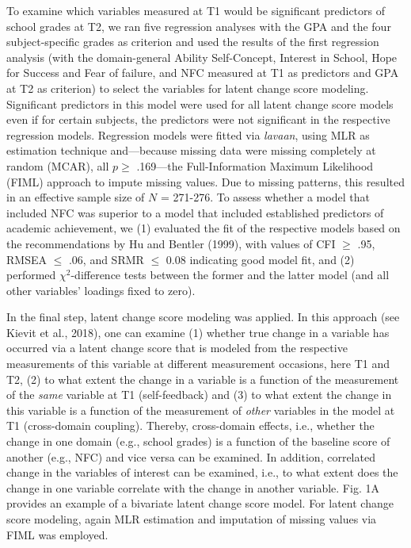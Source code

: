 \documentclass[
  man]{apa6}
\begin{document}
To examine which variables measured at T1 would be significant predictors of school grades at T2, we ran five regression analyses with the GPA and the four subject-specific grades as criterion and used the results of the first regression analysis (with the domain-general Ability Self-Concept, Interest in School, Hope for Success and Fear of failure, and NFC measured at T1 as predictors and GPA at T2 as criterion) to select the variables for latent change score modeling. Significant predictors in this model were used for all latent change score models even if for certain subjects, the predictors were not significant in the respective regression models. Regression models were fitted via \emph{lavaan}, using MLR as estimation technique and---because missing data were missing completely at random (MCAR), all \(p\ge\) .169---the Full-Information Maximum Likelihood (FIML) approach to impute missing values. Due to missing patterns, this resulted in an effective sample size of \(N\) = 271-276. To assess whether a model that included NFC was superior to a model that included established predictors of academic achievement, we (1) evaluated the fit of the respective models based on the recommendations by Hu and Bentler (1999), with values of CFI \(\ge\) .95, RMSEA \(\le\) .06, and SRMR \(\le\) 0.08 indicating good model fit, and (2) performed \(\chi^2\)-difference tests between the former and the latter model (and all other variables' loadings fixed to zero).

In the final step, latent change score modeling was applied. In this approach (see Kievit et al., 2018), one can examine (1) whether true change in a variable has occurred via a latent change score that is modeled from the respective measurements of this variable at different measurement occasions, here T1 and T2, (2) to what extent the change in a variable is a function of the measurement of the \emph{same} variable at T1 (self-feedback) and (3) to what extent the change in this variable is a function of the measurement of \emph{other} variables in the model at T1 (cross-domain coupling). Thereby, cross-domain effects, i.e., whether the change in one domain (e.g., school grades) is a function of the baseline score of another (e.g., NFC) and vice versa can be examined. In addition, correlated change in the variables of interest can be examined, i.e., to what extent does the change in one variable correlate with the change in another variable. Fig. 1A provides an example of a bivariate latent change score model. For latent change score modeling, again MLR estimation and imputation of missing values via FIML was employed.
\end{document}
